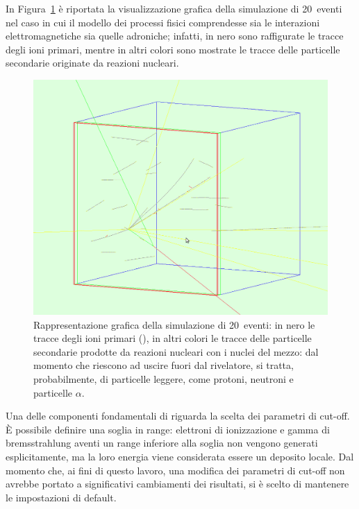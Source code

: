 In Figura~\ref{fig:simulazione_evento} è riportata la visualizzazione grafica della simulazione di 20~eventi nel caso in cui il modello dei processi fisici comprendesse sia le interazioni elettromagnetiche sia quelle adroniche; infatti, in nero sono raffigurate le tracce degli ioni primari, mentre in altri colori sono mostrate le tracce delle particelle secondarie originate da reazioni nucleari. 



\begin{figure} [!p]
	\centering
	\includegraphics[width=\textwidth, keepaspectratio]{Grafici/evento5_ritagliato.png}
	\caption{Rappresentazione grafica della simulazione di 20~eventi: in nero le tracce degli ioni primari (), in altri colori le tracce delle particelle secondarie prodotte da reazioni nucleari con i nuclei del mezzo: dal momento che riescono ad uscire fuori dal rivelatore, si tratta, probabilmente, di particelle leggere, come protoni, neutroni e particelle $\alpha$.} \label{fig:simulazione_evento}
\end{figure}




Una delle componenti fondamentali di \geant{} riguarda la scelta dei parametri di cut-off.
È possibile definire una soglia in range: elettroni di ionizzazione e gamma di bremsstrahlung aventi un range inferiore alla soglia non vengono generati esplicitamente, ma la loro energia viene considerata essere un deposito locale.
Dal momento che, ai fini di questo lavoro, una modifica dei parametri di cut-off non avrebbe portato a significativi cambiamenti dei risultati, si è scelto di mantenere le impostazioni di default.



